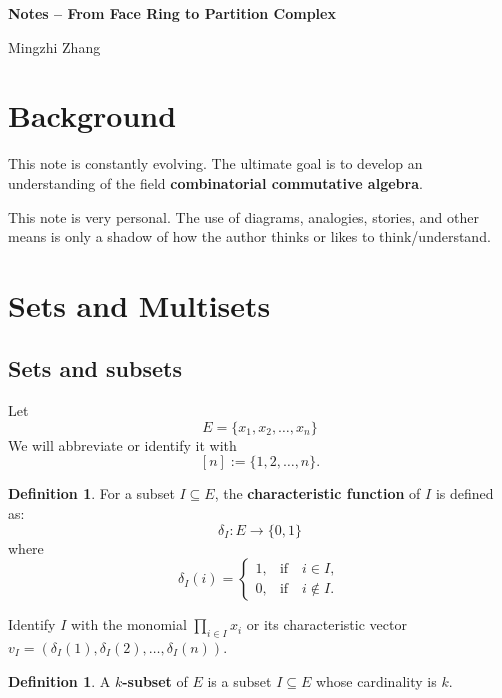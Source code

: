 \documentclass[12pt]{article}
\theoremstyle{definition}  %
\newtheorem{defi}[thm]{Definition}
\numberwithin{equation}{subsection}
\def\Prod{\textstyle\prod\limits}
\begin{document}
\sloppy  %

\setcounter{section}{-1}

\begin{center}
{\Large\bf 
Notes -- From Face Ring to Partition Complex
}\\ [7pt]
\end{center}

\vskip 3mm

\begin{center}
Mingzhi Zhang
\end{center}

\vskip 3mm

\section{Background}
This note is constantly evolving. The ultimate goal is to develop an understanding of the field \textbf{combinatorial commutative algebra}.

This note is very personal. The use of diagrams, analogies, stories, and other means is only a shadow of how the author thinks or likes to think/understand.



\section{Sets and Multisets}

\subsection{Sets and subsets}
Let
\[
E = \{x_1, x_2, \ldots, x_n\}
\]
We will abbreviate or identify it with
\[
[n] := \{1, 2, \ldots, n\}.
\]

\begin{defi}
For a subset $I \subseteq E$, the \textbf{characteristic function} of $I$ is defined as:
\[
\delta_I : E \to \{0,1\}
\]
where
\[
\delta_I(i) = 
\begin{cases} 
1, & \text{if} \quad i \in I, \\
0, & \text{if} \quad i \notin I.
\end{cases}
\]     
\end{defi}


Identify $I$ with the monomial $\Prod_{i \in I}x_{i}$ or its characteristic vector $v_I = (\delta_I(1), \delta_I(2), \ldots, \delta_I(n))$.

\begin{defi}
    A \textbf{$k$-subset} of $E$ is a subset $I \subseteq E$ whose cardinality is $k$.
\end{defi}
\end{document}

